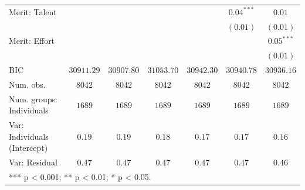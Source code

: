 \documentclass[
  12pt,
  a4paper,
]{article}
\begin{document}
\begin{table}[!ht]
\begin{center}
{\begin{tabular}{l c c c c c c}
Merit: Talent                       &               &               &               &               & $0.04^{***}$  & $0.01$        \\
                                    &               &               &               &               & $(0.01)$      & $(0.01)$      \\
Merit: Effort                       &               &               &               &               &               & $0.05^{***}$  \\
                                    &               &               &               &               &               & $(0.01)$      \\
\hline
BIC                                 & $30911.29$    & $30907.80$    & $31053.70$    & $30942.30$    & $30940.78$    & $30936.16$    \\
Num. obs.                           & $8042$        & $8042$        & $8042$        & $8042$        & $8042$        & $8042$        \\
Num. groups: Individuals            & $1689$        & $1689$        & $1689$        & $1689$        & $1689$        & $1689$        \\
Var: Individuals (Intercept)        & $0.19$        & $0.19$        & $0.18$        & $0.17$        & $0.17$        & $0.16$        \\
Var: Residual                       & $0.47$        & $0.47$        & $0.47$        & $0.47$        & $0.47$        & $0.46$        \\
\hline
\multicolumn{7}{l}{\scriptsize{*** p < 0.001; ** p < 0.01; * p < 0.05.}}
\end{tabular}
}
\label{table:coefficients}
\end{center}
\end{table}
\end{document}
